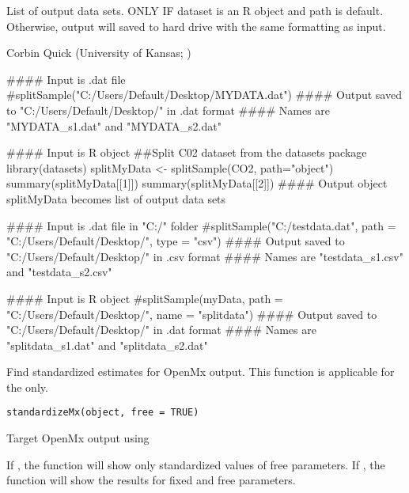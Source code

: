 \documentclass[a4paper]{book}
\begin{document}
%
\begin{Value}
\begin{ldescription}
\item[\code{dataL}] List of output data sets. ONLY IF dataset is an R object and path is default. Otherwise, output will saved to hard drive with the same formatting as input.
\end{ldescription}
\end{Value}
%
\begin{Author}\relax
Corbin Quick (University of Kansas; )
\end{Author}
%
\begin{Examples}
\begin{ExampleCode}
#### Input is .dat file
#splitSample("C:/Users/Default/Desktop/MYDATA.dat")
#### Output saved to "C:/Users/Default/Desktop/" in .dat format
#### Names are "MYDATA_s1.dat" and "MYDATA_s2.dat"

#### Input is R object
##Split C02 dataset from the datasets package
library(datasets)
splitMyData <- splitSample(CO2, path="object")
summary(splitMyData[[1]])
summary(splitMyData[[2]])
#### Output object splitMyData becomes list of output data sets

#### Input is .dat file in "C:/" folder
#splitSample("C:/testdata.dat", path = "C:/Users/Default/Desktop/", type = "csv")
#### Output saved to "C:/Users/Default/Desktop/" in .csv format
#### Names are "testdata_s1.csv" and "testdata_s2.csv"

#### Input is R object
#splitSample(myData, path = "C:/Users/Default/Desktop/", name = "splitdata")
#### Output saved to "C:/Users/Default/Desktop/" in .dat format
#### Names are "splitdata_s1.dat" and "splitdata_s2.dat"
\end{ExampleCode}
\end{Examples}
%
\begin{Description}\relax
Find standardized estimates for OpenMx output. This function is applicable for the  only. 
\end{Description}
%
\begin{Usage}
\begin{verbatim}
standardizeMx(object, free = TRUE)
\end{verbatim}
\end{Usage}
%
\begin{Arguments}
\begin{ldescription}
\item[\code{object}] 
Target OpenMx output using 

\item[\code{free}] 
If , the function will show only standardized values of free parameters. If , the function will show the results for fixed and free parameters.

\end{ldescription}
\end{Arguments}
\end{document}
